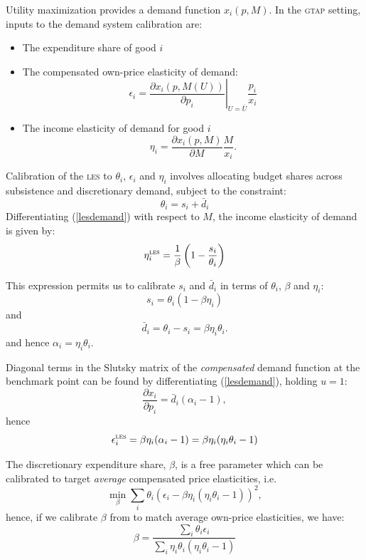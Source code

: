 Utility maximization provides a demand function $x_i(p,M)$.  In
the \textsc{gtap} setting, inputs to the demand system calibration are:
\begin{itemize}
\item[$\theta_i$]       The expenditure share of good $i$
\item[$\epsilon_i$]     The compensated own-price elasticity of demand:
$$\epsilon_i = \left. \frac{\partial x_i(p,M(U))}{\partial p_i}\right|_{U=\bar
U} \frac{p_i}{x_i}$$
\item[$\eta_i$]         The income elasticity of demand for good $i$
$$\eta_i = \frac{\partial x_i(p,M)}{\partial M} \frac{M}{x_i}.$$
\end{itemize}

Calibration of the \textsc{les} to $\theta_i$, $\epsilon_i$ and
$\eta_i$ involves allocating budget shares across
subsistence and discretionary demand, subject to the constraint:
$$\theta_i = s_i + \bar d_i$$
Differentiating (\ref{lesdemand}) with respect to $M$, the income
elasticity of demand is given by:
$$\eta^{\rm \textsc{les}}_i = \frac{1}{\beta} \left( 1 - \frac{s_i}{\theta_i} \right)$$

This expression permits us to calibrate $s_i$ and $\bar d_i$ in terms
of $\theta_i$, $\beta$ and $\eta_i$:
$$s_i = \theta_i (1 - \beta \eta_i)$$
and
$$\bar d_i = \theta_i - s_i = \beta \eta_i \theta_i.$$
and hence $\alpha_i = \eta_i \theta_i$.

Diagonal terms in the Slutsky matrix of the \textit{compensated}
demand function at the benchmark point can be found by differentiating
(\ref{lesdemand}), holding $u=1$:
$$\frac{\partial x_i}{\partial p_i} = \bar d_i (\alpha_i - 1),$$
hence
\begin{equation}
\label{epsilondef}
\epsilon^{\rm \textsc{les}}_i = \beta \eta_i ( \alpha_i  - 1) = \beta \eta_i (
\eta_i \theta_i - 1)
\end{equation}

The discretionary expenditure share, $\beta$, is a free parameter
which can be calibrated to target \textit{average} compensated price
elasticities, i.e.
$$\min_\beta \sum_i \theta_i \left( \epsilon_i - \beta \eta_i \left(
\eta_i \theta_i - 1 \right) \right)^2,$$
hence, if we calibrate $\beta$ from to match average own-price
elasticities, we have:
$$ \beta = \frac{\sum_i \theta_i \epsilon_i}{\sum_i \eta_i
\theta_i (\eta_i \theta_i - 1)}$$

